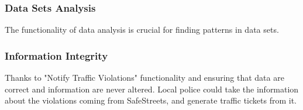 \subsubsection{Data Sets Analysis}
The functionality of data analysis is crucial for finding patterns in data sets.

\subsubsection{Information Integrity}
Thanks to "Notify Traffic Violations" functionality and ensuring that data are correct and information are never altered.
Local police could take the information about the violations coming from SafeStreets, and generate traffic tickets from it. 

